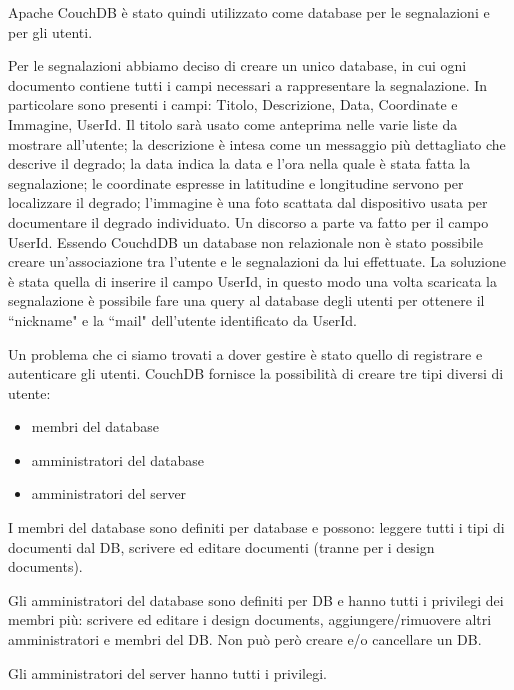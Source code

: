 		Apache CouchDB\texttrademark{} è stato quindi utilizzato come database 
		per le segnalazioni e per gli utenti.
		
		Per le segnalazioni abbiamo deciso di creare un unico database, in cui 
		ogni documento contiene tutti i campi necessari a rappresentare la segnalazione.
		In particolare sono presenti i campi: Titolo, Descrizione, Data, Coordinate e 
		Immagine, UserId. 
		Il titolo sarà usato come anteprima nelle varie liste da mostrare all'utente; 
		la descrizione è intesa come un messaggio più dettagliato che descrive il 
		degrado; la data indica la data e l'ora nella quale è stata fatta la
		segnalazione; le coordinate espresse in latitudine e longitudine servono 
		per localizzare il degrado; l'immagine è una foto scattata dal dispositivo usata 
		per documentare il degrado individuato.
		Un discorso a parte va fatto per il campo UserId. Essendo CouchdDB un 
		database non relazionale non è stato possibile creare un'associazione 
		tra l'utente e le segnalazioni da lui effettuate. La soluzione è stata 
		quella di inserire il campo UserId, in questo modo una volta scaricata 
		la segnalazione è possibile fare una query al database degli utenti per 
		ottenere il ``nickname" e la ``mail" dell'utente identificato da UserId.
		
		Un problema che ci siamo trovati a dover gestire è stato quello di
		registrare e autenticare gli utenti. CouchDB fornisce la 
		possibilità di creare tre tipi diversi di utente:
		\begin{itemize}
			\item membri del database
			\item amministratori del database
			\item amministratori del server
		\end{itemize}
		I membri del database sono definiti per database e possono: leggere tutti
		i tipi di documenti dal DB, scrivere ed editare documenti 
		(tranne per i design documents).

		Gli amministratori del database sono definiti per DB e hanno tutti i 
		privilegi dei membri più: scrivere ed editare i design documents, 
		aggiungere/rimuovere altri amministratori e membri del DB. 
		Non può però creare e/o cancellare un DB.

		Gli amministratori del server hanno tutti i privilegi.
		
